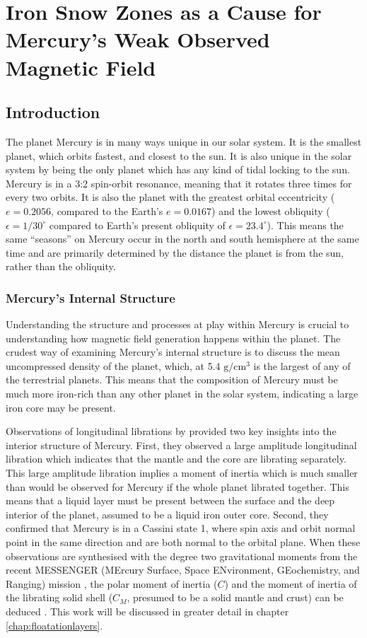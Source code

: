 \chapter{Iron Snow Zones as a Cause for Mercury's Weak Observed Magnetic Field}
\label{chap:doublesnowstates}
\section{Introduction}
The planet Mercury is in many ways unique in our solar system. It is the smallest planet, which orbits fastest, and closest to the sun. It is also unique in the solar system by being the only planet which has any kind of tidal locking to the sun. Mercury is in a 3:2 spin-orbit resonance, meaning that it rotates three times for every two orbits. It is also the planet with the greatest orbital eccentricity ($e=0.2056$, compared to the Earth's $e=0.0167$) and the lowest obliquity ($\epsilon=1/30^\circ$ compared to Earth's present obliquity of $\epsilon=23.4^\circ$). This means the same ``seasons'' on Mercury occur in the north and south hemisphere at the same time and are primarily determined by the distance the planet is from the sun, rather than the obliquity.

\subsection{Mercury's Internal Structure}
Understanding the structure and processes at play within Mercury is crucial to understanding how magnetic field generation happens within the planet. The crudest way of examining Mercury's internal structure is to discuss the mean uncompressed density of the planet, which, at 5.4 $\textrm{g}/\textrm{cm}^3$ is the largest of any of the terrestrial planets. This means that the composition of Mercury must be much more iron-rich than any other planet in the solar system, indicating a large iron core may be present. 

Observations of longitudinal librations by \citet{margot2007} provided two key insights into the interior structure of Mercury. First, they observed a large amplitude longitudinal libration which indicates that the mantle and the core are librating separately. This large amplitude libration implies a moment of inertia which is much smaller than would be observed for Mercury if the whole planet librated together. This means that a liquid layer must be present between the surface and the deep interior of the planet, assumed to be a liquid iron outer core. Second, they confirmed that Mercury is in a Cassini state 1, where spin axis and orbit normal point in the same direction and are both normal to the orbital plane. When these observations are synthesised with the degree two gravitational moments from the recent MESSENGER (MErcury Surface, Space ENvironment, GEochemistry, and Ranging) mission \citep{smith2012}, the polar moment of inertia ($C$) and the moment of inertia of the librating solid shell ($C_M$, presumed to be a solid mantle and crust) can be deduced \citep{peale1969}. This work will be discussed in greater detail in chapter \ref{chap:floatationlayers}.

